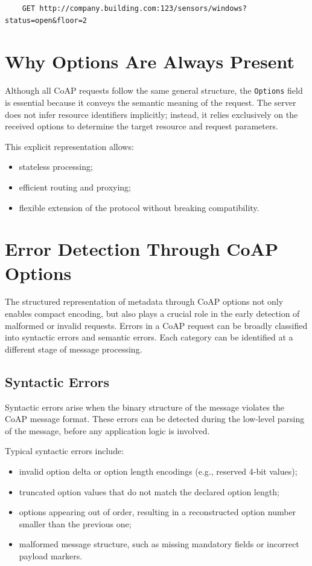 \documentclass{scrbook}
\begin{document}
\begin{verbatim}
    GET http://company.building.com:123/sensors/windows?status=open&floor=2
\end{verbatim}

\section{Why Options Are Always Present}

Although all CoAP requests follow the same general structure, the \texttt{Options} field is essential because it conveys the semantic meaning of the request. The server does not infer resource identifiers implicitly; instead, it relies exclusively on the received options to determine the target resource and request parameters.

This explicit representation allows:
\begin{itemize}
    \item stateless processing;
    \item efficient routing and proxying;
    \item flexible extension of the protocol without breaking compatibility.
\end{itemize}

\section{Error Detection Through CoAP Options}

The structured representation of metadata through CoAP options not only enables compact encoding, but also plays a crucial role in the early detection of malformed or invalid requests. Errors in a CoAP request can be broadly classified into syntactic errors and semantic errors. Each category can be identified at a different stage of message processing.

\subsection{Syntactic Errors}

Syntactic errors arise when the binary structure of the message violates the CoAP message format. These errors can be detected during the low-level parsing of the message, before any application logic is involved.

Typical syntactic errors include:

\begin{itemize}
    \item invalid option delta or option length encodings (e.g., reserved 4-bit values);
    \item truncated option values that do not match the declared option length;
    \item options appearing out of order, resulting in a reconstructed option number smaller than the previous one;
    \item malformed message structure, such as missing mandatory fields or incorrect payload markers.
\end{itemize}
\end{document}
